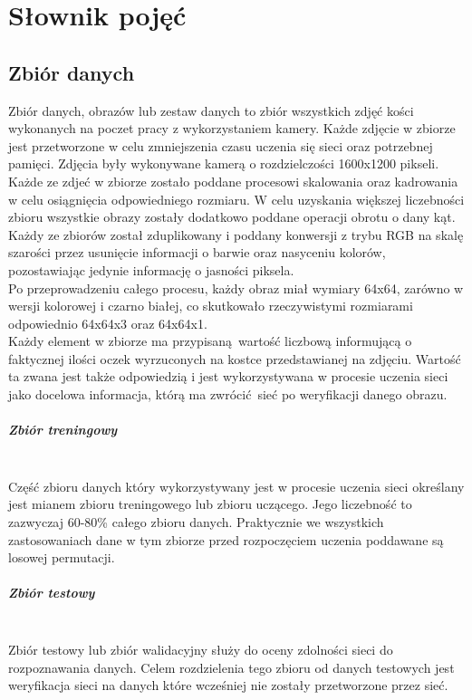 
\chapter{Słownik pojęć}

\section{Zbiór danych}
Zbiór danych, obrazów lub zestaw danych to zbiór wszystkich zdjęć kości wykonanych na poczet
pracy z wykorzystaniem kamery. Każde zdjęcie w zbiorze jest przetworzone w celu
zmniejszenia czasu uczenia się sieci oraz potrzebnej pamięci. Zdjęcia były wykonywane
kamerą o rozdzielczości 1600x1200 pikseli. Każde ze zdjeć w zbiorze zostało
poddane procesowi skalowania oraz kadrowania w celu osiągnięcia odpowiedniego
rozmiaru. W celu uzyskania większej liczebności zbioru wszystkie obrazy zostały
dodatkowo poddane operacji obrotu o dany kąt. Każdy ze zbiorów został zduplikowany
i poddany konwersji z trybu RGB na skalę szarości przez usunięcie informacji o barwie
oraz nasyceniu kolorów, pozostawiając jedynie informację o jasności piksela. \\
Po przeprowadzeniu całego procesu, każdy obraz miał wymiary 64x64, zarówno w wersji
kolorowej i czarno białej, co skutkowało rzeczywistymi rozmiarami odpowiednio 64x64x3
oraz 64x64x1. \\
Każdy element w zbiorze ma przypisaną wartość liczbową informującą o faktycznej ilości
oczek wyrzuconych na kostce przedstawianej na zdjęciu. Wartość ta zwana jest także
odpowiedzią i jest wykorzystywana w procesie uczenia sieci jako docelowa informacja,
którą ma zwrócić sieć po weryfikacji danego obrazu.

\paragraph{Zbiór treningowy} \mbox{}\\
Część zbioru danych który wykorzystywany jest w procesie uczenia sieci określany
jest mianem zbioru treningowego lub zbioru uczącego. Jego liczebność to zazwyczaj 60-80\%
całego zbioru danych. Praktycznie we wszystkich zastosowaniach dane w tym zbiorze przed
rozpoczęciem uczenia poddawane są losowej permutacji.

\paragraph{Zbiór testowy} \mbox{}\\
Zbiór testowy lub zbiór walidacyjny służy do oceny zdolności sieci do rozpoznawania
danych. Celem rozdzielenia tego zbioru od danych testowych jest weryfikacja sieci
na danych które wcześniej nie zostały przetworzone przez sieć.

